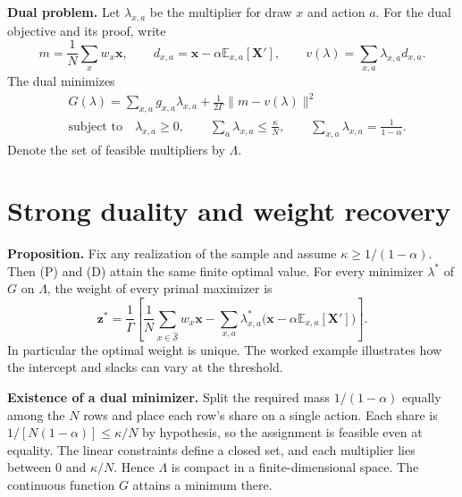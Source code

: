 \documentclass[12pt,a4paper]{article}
\newcommand{\norm}[1]{\lVert #1\rVert}
\newcommand{\lead}[1]{\par\smallskip\noindent\textbf{#1}\enspace}
\begin{document}
\lead{Dual problem.} Let \(\lambda_{x,a}\) be the multiplier for draw \(x\)
and action \(a\). For the dual objective and its proof, write
\[
 m=\frac1N\sum_x w_x\mathbf x,\qquad
 d_{x,a}=\mathbf x-\alpha\mathbb E_{x,a}[\mathbf X'],\qquad
 v(\lambda)=\sum_{x,a}\lambda_{x,a}d_{x,a}.
\]
The dual minimizes
\[
 \begin{aligned}
   &G(\lambda)=\sum_{x,a}g_{x,a}\lambda_{x,a}
       +\frac{1}{2\Gamma}\norm{m-v(\lambda)}^2\\
   &\text{subject to}\quad \lambda_{x,a}\ge0,\qquad
        \sum_a\lambda_{x,a}\le\frac{\kappa}{N},\qquad
        \sum_{x,a}\lambda_{x,a}=\frac{1}{1-\alpha}.
 \end{aligned}
 \tag{D}
\]
Denote the set of feasible multipliers by \(\Lambda\).

\newpage
\section*{Strong duality and weight recovery}
\textbf{Proposition.} Fix any realization of the sample and assume
\(\kappa\ge 1/(1-\alpha)\). Then (P) and (D) attain the same finite optimal
value. For every minimizer \(\lambda^*\) of \(G\) on \(\Lambda\), the weight
of every primal maximizer is
\[
 \mathbf z^*=\frac{1}{\Gamma}\left[
     \frac1N\sum_{x\in\widehat{\mathcal S}} w_x\mathbf x
     -\sum_{x,a}\lambda^*_{x,a}
        \bigl(\mathbf x-\alpha\mathbb E_{x,a}[\mathbf X']\bigr)\right].
             \tag{1}\label{eq:weight}
\]
In particular the optimal weight is unique. The worked example illustrates
how the intercept and slacks can vary at the threshold.

\lead{Existence of a dual minimizer.}
Split the required mass \(1/(1-\alpha)\) equally among the \(N\) rows and
place each row's share on a single action. Each share is
\(1/[N(1-\alpha)]\le\kappa/N\) by hypothesis, so the assignment is feasible
even at equality. The linear constraints define a closed set, and each
multiplier lies between \(0\) and \(\kappa/N\). Hence \(\Lambda\) is
compact in a finite-dimensional space. The continuous function \(G\)
attains a minimum there.
\end{document}

